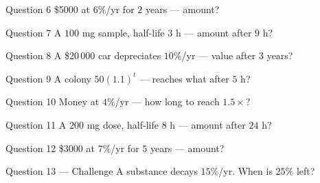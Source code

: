 \documentclass[11pt]{article}
\begin{document}
\begin{qbox}{Question 6}
\$5000 at $6\%$/yr for $2$ years — amount?\workspace{2.4cm}
\end{qbox}

\begin{qbox}{Question 7}
A $100$ mg sample, half-life $3$ h — amount after $9$ h?\workspace{2.4cm}
\end{qbox}

\begin{qbox}{Question 8}
A \$20\,000 car depreciates $10\%$/yr — value after $3$ years?\workspace{2.4cm}
\end{qbox}

\begin{qbox}{Question 9}
A colony $50(1.1)^{t}$ — reaches what after $5$ h?\workspace{2.4cm}
\end{qbox}

\begin{qbox}{Question 10}
Money at $4\%$/yr — how long to reach $1.5\times$?\workspace{2.4cm}
\end{qbox}

\begin{qbox}{Question 11}
A $200$ mg dose, half-life $8$ h — amount after $24$ h?\workspace{2.4cm}
\end{qbox}

\begin{qbox}{Question 12}
\$3000 at $7\%$/yr for $5$ years — amount?\workspace{2.4cm}
\end{qbox}

\begin{qbox}{Question 13 --- Challenge}
A substance decays $15\%$/yr. When is $25\%$ left?\workspace{3.2cm}
\end{qbox}

\clearpage
{}
\end{document}
